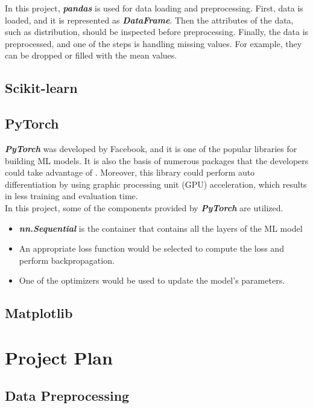 \documentclass[12pt,twoside]{report}
\begin{document}
In this project, \textbf{\textit{pandas}} is used for data loading and preprocessing. First, data is loaded, and it is represented as \textbf{\textit{DataFrame}}. Then the attributes of the data, such as distribution, should be inspected before preprocessing. Finally, the data is preprocessed, and one of the steps is handling missing values. For example, they can be dropped or filled with the mean values. 

\section{Scikit-learn}

\section{PyTorch}
\textbf{\textit{PyTorch}} was developed by Facebook, and it is one of the popular libraries for building ML models. It is also the basis of numerous packages that the developers could take advantage of \citep{RN5}. Moreover, this library could perform auto differentiation by using graphic processing unit (GPU) acceleration, which results in less training and evaluation time. 
\\

In this project, some of the components provided by \textbf{\textit{PyTorch}} are utilized.
\begin{itemize}
	\item \textbf{\textit{nn.Sequential}} is the container that contains all the layers of the ML model
	\item An appropriate loss function would be selected to compute the loss and perform backpropagation. 
	\item One of the optimizers would be used to update the model's parameters. 
\end{itemize}

\section{Matplotlib}



\chapter{Project Plan}

\section{Data Preprocessing}
\end{document}
